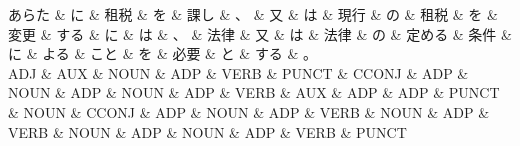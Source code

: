 \documentclass[tikz,border=5pt]{standalone}
\begin{document}
\small
\begin{dependency}[edge unit distance=12.0pt]
    \begin{deptext}[column sep=0.5em]
        あらた \& に \& 租税 \& を \& 課し \& 、 \& 又 \& は \& 現行 \& の \& 租税 \& を \& 変更 \& する \& に \& は \& 、 \& 法律 \& 又 \& は \& 法律 \& の \& 定める \& 条件 \& に \& よる \& こと \& を \& 必要 \& と \& する \& 。\\
        ADJ \& AUX \& NOUN \& ADP \& VERB \& PUNCT \& CCONJ \& ADP \& NOUN \& ADP \& NOUN \& ADP \& VERB \& AUX \& ADP \& ADP \& PUNCT \& NOUN \& CCONJ \& ADP \& NOUN \& ADP \& VERB \& NOUN \& ADP \& VERB \& NOUN \& ADP \& NOUN \& ADP \& VERB \& PUNCT\\
    \end{deptext}
\end{dependency}
\end{document}

